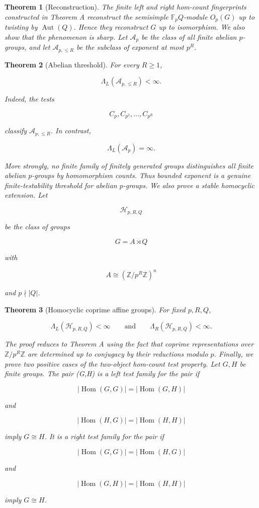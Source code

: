\documentclass[11pt]{article}
\newtheorem{theorem}{Theorem}[section]
\begin{document}
\begin{theorem}[Reconstruction]
The finite left and right hom-count fingerprints constructed in Theorem A reconstruct the semisimple $\mathbb F_pQ$-module $O_p(G)$ up to twisting by $\operatorname{Aut}(Q)$. Hence they reconstruct $G$ up to isomorphism. We also show that the phenomenon is sharp. Let $\mathcal A_p$ be the class of all finite abelian $p$-groups, and let $\mathcal A_{p,\le R}$ be the subclass of exponent at most $p^R$.

\end{theorem}

\begin{theorem}[Abelian threshold]
For every $R\ge1$,

\[
\Lambda_L(\mathcal A_{p,\le R})<\infty.
\]

Indeed, the tests

\[
C_p,C_{p^2},\ldots,C_{p^R}
\]

classify $\mathcal A_{p,\le R}$. In contrast,

\[
\Lambda_L(\mathcal A_p)=\infty.
\]

More strongly, no finite family of finitely generated groups distinguishes all finite abelian $p$-groups by homomorphism counts. Thus bounded exponent is a genuine finite-testability threshold for abelian $p$-groups. We also prove a stable homocyclic extension. Let

\[
\mathcal H_{p,R,Q}
\]

be the class of groups

\[
G=A\rtimes Q
\]

with

\[
A\cong(\mathbb Z/p^R\mathbb Z)^n
\]

and $p\nmid |Q|$.

\end{theorem}

\begin{theorem}[Homocyclic coprime affine groups]
For fixed $p,R,Q$,

\[
\Lambda_L(\mathcal H_{p,R,Q})<\infty
\qquad\text{and}\qquad
\Lambda_R(\mathcal H_{p,R,Q})<\infty.
\]

The proof reduces to Theorem A using the fact that coprime representations over $\mathbb Z/p^R\mathbb Z$ are determined up to conjugacy by their reductions modulo $p$. Finally, we prove two positive cases of the two-object hom-count test property. Let $G,H$ be finite groups. The pair ({G,H}) is a left test family for the pair if

\[
|\operatorname{Hom}(G,G)|=|\operatorname{Hom}(G,H)|
\]

and

\[
|\operatorname{Hom}(H,G)|=|\operatorname{Hom}(H,H)|
\]

imply $G\cong H$. It is a right test family for the pair if

\[
|\operatorname{Hom}(G,G)|=|\operatorname{Hom}(H,G)|
\]

and

\[
|\operatorname{Hom}(G,H)|=|\operatorname{Hom}(H,H)|
\]

imply $G\cong H$.

\end{theorem}
\end{document}

